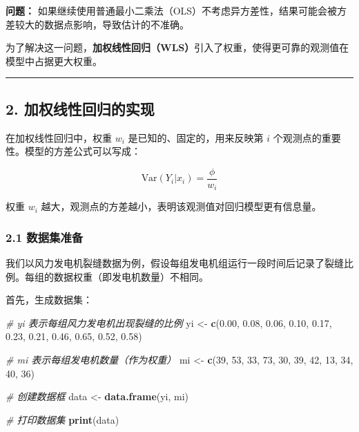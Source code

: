 \documentclass[
  10pt,
]{ctexart}
\newenvironment{Shaded}{\begin{snugshade}}{\end{snugshade}}
\newcommand{\CommentTok}[1]{\textcolor[rgb]{0.56,0.35,0.01}{\textit{#1}}}
\newcommand{\DecValTok}[1]{\textcolor[rgb]{0.00,0.00,0.81}{#1}}
\newcommand{\FloatTok}[1]{\textcolor[rgb]{0.00,0.00,0.81}{#1}}
\newcommand{\FunctionTok}[1]{\textcolor[rgb]{0.13,0.29,0.53}{\textbf{#1}}}
\newcommand{\NormalTok}[1]{#1}
\newcommand{\OtherTok}[1]{\textcolor[rgb]{0.56,0.35,0.01}{#1}}
\begin{document}
\textbf{问题：}
如果继续使用普通最小二乘法（OLS）不考虑异方差性，结果可能会被方差较大的数据点影响，导致估计的不准确。

为了解决这一问题，\textbf{加权线性回归（WLS）}引入了权重，使得更可靠的观测值在模型中占据更大权重。

\begin{center}\rule{0.5\linewidth}{0.5pt}\end{center}

\hypertarget{ux52a0ux6743ux7ebfux6027ux56deux5f52ux7684ux5b9eux73b0}{%
\subsection{2.
加权线性回归的实现}\label{ux52a0ux6743ux7ebfux6027ux56deux5f52ux7684ux5b9eux73b0}}

在加权线性回归中，权重 \(w_i\) 是已知的、固定的，用来反映第 \(i\)
个观测点的重要性。模型的方差公式可以写成：

\[
\text{Var}(Y_i | x_i) = \frac{\phi}{w_i}
\]

权重 \(w_i\) 越大，观测点的方差越小，表明该观测值对回归模型更有信息量。

\hypertarget{ux6570ux636eux96c6ux51c6ux5907}{%
\subsubsection{2.1 数据集准备}\label{ux6570ux636eux96c6ux51c6ux5907}}

我们以风力发电机裂缝数据为例，假设每组发电机组运行一段时间后记录了裂缝比例。每组的数据权重（即发电机数量）不相同。

首先，生成数据集：

\begin{Shaded}
\begin{Highlighting}[]
\CommentTok{\# yi 表示每组风力发电机出现裂缝的比例}
\NormalTok{yi }\OtherTok{\textless{}{-}} \FunctionTok{c}\NormalTok{(}\FloatTok{0.00}\NormalTok{, }\FloatTok{0.08}\NormalTok{, }\FloatTok{0.06}\NormalTok{, }\FloatTok{0.10}\NormalTok{, }\FloatTok{0.17}\NormalTok{, }\FloatTok{0.23}\NormalTok{, }\FloatTok{0.21}\NormalTok{, }\FloatTok{0.46}\NormalTok{, }\FloatTok{0.65}\NormalTok{, }\FloatTok{0.52}\NormalTok{, }\FloatTok{0.58}\NormalTok{)}

\CommentTok{\# mi 表示每组发电机数量（作为权重）}
\NormalTok{mi }\OtherTok{\textless{}{-}} \FunctionTok{c}\NormalTok{(}\DecValTok{39}\NormalTok{, }\DecValTok{53}\NormalTok{, }\DecValTok{33}\NormalTok{, }\DecValTok{73}\NormalTok{, }\DecValTok{30}\NormalTok{, }\DecValTok{39}\NormalTok{, }\DecValTok{42}\NormalTok{, }\DecValTok{13}\NormalTok{, }\DecValTok{34}\NormalTok{, }\DecValTok{40}\NormalTok{, }\DecValTok{36}\NormalTok{)}

\CommentTok{\# 创建数据框}
\NormalTok{data }\OtherTok{\textless{}{-}} \FunctionTok{data.frame}\NormalTok{(yi, mi)}

\CommentTok{\# 打印数据集}
\FunctionTok{print}\NormalTok{(data)}
\end{Highlighting}
\end{Shaded}
\end{document}
